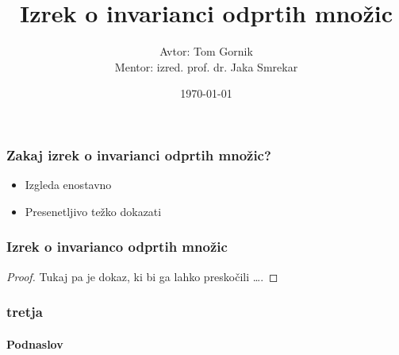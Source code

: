 \documentclass{beamer}
\title{Izrek o invarianci odprtih množic}
\author[Tom Gornik]{Avtor: Tom Gornik\\ \footnotesize Mentor: izred. prof. dr. Jaka Smrekar}
\institute{Fakulteta za matematiko in fiziko}
\date{\today}
\begin{document}

\frame{\titlepage}

\begin{frame}

\frametitle{Zakaj izrek o invarianci odprtih množic?}

\begin{itemize}
\item Izgleda enostavno
\item Presenetljivo težko dokazati

\end{itemize}



\end{frame}

\begin{frame}

\frametitle{Izrek o invarianco odprtih množic}
\begin{overprint}
 \hfill{}
\begin{proof}
Tukaj pa je dokaz, ki bi ga lahko preskočili \ldots.
\end{proof}
\end{overprint}

\end{frame}

\begin{frame}

\frametitle{tretja}
\framesubtitle{Podnaslov}

\end{frame}
\end{document}
